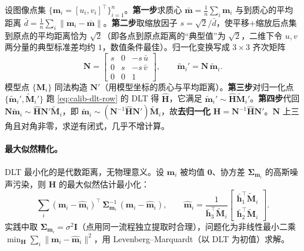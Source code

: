 \begin{derivation}
设图像点集 $\{\mathbf{m}_i=[u_i,v_i]^\top\}_{i=1}^n$。\textbf{第一步}求质心 $\bar{\mathbf{m}}=\tfrac1n\sum_i\mathbf{m}_i$ 与到质心的平均距离 $\bar d=\tfrac1n\sum_i\|\mathbf{m}_i-\bar{\mathbf{m}}\|$。\textbf{第二步}取缩放因子 $s=\sqrt2/\bar d$，使平移$+$缩放后点集到原点的平均距离恰为 $\sqrt2$（即各点到原点距离的“典型值”为 $\sqrt2$，二维下令 $u,v$ 两分量的典型标准差均约 $1$，数值条件最佳\cite{hartley1995defence,hartley2004multiview}）。归一化变换写成 $3\times3$ 齐次矩阵
\[
  \mathbf{N}=\begin{bmatrix} s & 0 & -s\,\bar u\\ 0 & s & -s\,\bar v\\ 0 & 0 & 1\end{bmatrix},
  \qquad \tilde{\mathbf{m}}_i' = \mathbf{N}\,\tilde{\mathbf{m}}_i .
\]
模型点 $\{\mathbf{M}_i\}$ 同法构造 $\mathbf{N}'$（用模型坐标的质心与平均距离）。\textbf{第三步}对归一化点 $\{\tilde{\mathbf{m}}_i',\tilde{\mathbf{M}}_i'\}$ 跑 \cref{eq:calib-dlt-row} 的 DLT 得 $\hat{\mathbf{H}}$，它满足 $\tilde{\mathbf{m}}_i'\sim\hat{\mathbf{H}}\tilde{\mathbf{M}}_i'$。\textbf{第四步}代回 $\mathbf{N}\tilde{\mathbf{m}}_i\sim\hat{\mathbf{H}}\mathbf{N}'\tilde{\mathbf{M}}_i$，即 $\tilde{\mathbf{m}}_i\sim(\mathbf{N}^{-1}\hat{\mathbf{H}}\mathbf{N}')\tilde{\mathbf{M}}_i$，故\textbf{去归一化} $\mathbf{H}=\mathbf{N}^{-1}\hat{\mathbf{H}}\mathbf{N}'$。$\mathbf{N}$ 上三角且对角非零，求逆有闭式，几乎不增计算。
\end{derivation}

\paragraph{最大似然精化。}
DLT 最小化的是代数距离，无物理意义。设 $\mathbf{m}_i$ 被均值 $\mathbf{0}$、协方差 $\boldsymbol{\Sigma}_{\mathbf{m}_i}$ 的高斯噪声污染，则 $\mathbf{H}$ 的最大似然估计最小化\cite{zhang2000calibration}：
\begin{equation}
  \sum_i (\mathbf{m}_i-\hat{\mathbf{m}}_i)^\top\,\boldsymbol{\Sigma}_{\mathbf{m}_i}^{-1}\,(\mathbf{m}_i-\hat{\mathbf{m}}_i),
  \qquad
  \hat{\mathbf{m}}_i=\frac{1}{\bar{\mathbf{h}}_3^\top\tilde{\mathbf{M}}_i}\begin{bmatrix}\bar{\mathbf{h}}_1^\top\tilde{\mathbf{M}}_i\\ \bar{\mathbf{h}}_2^\top\tilde{\mathbf{M}}_i\end{bmatrix}.
  \label{eq:calib-h-mle}
\end{equation}
实践中取 $\boldsymbol{\Sigma}_{\mathbf{m}_i}=\sigma^2\mathbf{I}$（点用同一流程独立提取时合理），问题化为非线性最小二乘 $\min_{\mathbf{H}}\sum_i\|\mathbf{m}_i-\hat{\mathbf{m}}_i\|^2$，用 Levenberg--Marquardt\cite{more1978lm}（以 DLT 为初值）求解。

